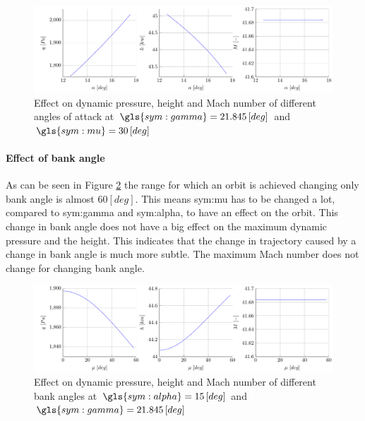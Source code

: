 \begin{figure}[h]
	\centering
	\includegraphics[width=\textwidth]{./Figure/orbit/effectalpha.pdf}
	\caption[Effect on dynamic pressure, height and Mach number of different angles of attack]{Effect on dynamic pressure, height and Mach number of different angles of attack at $\gls{sym:gamma}=21.845 \left[deg\right]$ and $\gls{sym:mu}=30 \left[deg\right]$}
	\label{fig:effectalpha}
\end{figure}

\paragraph{Effect of bank angle}

As can be seen in Figure \ref{fig:effectmu} the range for which an orbit is achieved changing only bank angle is almost $60 \left[deg\right]$. This means \gls{sym:mu} has to be changed a lot, compared to \gls{sym:gamma} and \gls{sym:alpha}, to have an effect on the orbit. This change in bank angle does not have a big effect on the maximum dynamic pressure and the height. This indicates that the change in trajectory caused by a change in bank angle is much more subtle. The maximum Mach number does not change for changing bank angle.

\begin{figure}[h]
	\centering
	\includegraphics[width=\textwidth]{./Figure/orbit/effectmu.pdf}
	\caption[Effect on dynamic pressure, height and Mach number of different bank angles]{Effect on dynamic pressure, height and Mach number of different bank angles at $\gls{sym:alpha}=15 \left[deg\right]$ and $\gls{sym:gamma}=21.845 \left[deg\right]$}
	\label{fig:effectmu}
\end{figure}